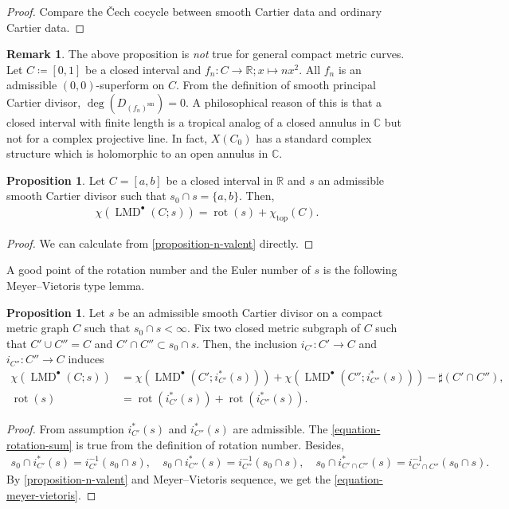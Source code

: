 \documentclass[a4paper,dvipdfmx,reqno,12pt]{amsart}
\theoremstyle{definition}
\newtheorem{proposition}[theorem]{Proposition}
\newtheorem{remark}[theorem]{Remark}
\newcommand{\deq}{\coloneqq}
\newcommand{\opn}[1]{\operatorname{#1}}
\numberwithin{equation}{section}
\begin{document}
\begin{proof}
Compare the \v{C}ech cocycle between smooth Cartier data and ordinary Cartier data.
\end{proof}

\begin{remark}
\label{remark-rotation-closed-interval} 
The above proposition 
is \emph{not} true for general compact metric curves.
Let $C\deq [0,1]$ be a closed interval
and $f_n\colon C\to \mathbb{R};x \mapsto nx^{2}$.
All $f_n$ is an admissible $(0,0)$-superform on $C$.
From the definition of smooth principal Cartier divisor,
$\opn{deg}(D_{(f_n)^{\mathrm{sm}}})=0$. 
A philosophical reason of this is that
a closed interval with finite length is a tropical
analog of a closed annulus in $\mathbb{C}$ but not for
a complex projective line. In fact, $X(C_0)$ 
has a standard complex structure which is holomorphic to
an open annulus in $\mathbb{C}$.
\end{remark}

\begin{proposition}
\label{proposition-simple-interval-rr}
Let $C=[a,b]$ be a closed interval in $\mathbb{R}$
and $s$ an admissible smooth Cartier divisor 
such that $s_0\cap s=\{a,b\}$. Then,
\begin{align}
\chi(\opn{LMD}^{\bullet}(C;s))=\opn{rot}(s)+
\chi_{\opn{top}}(C).
\end{align}
\end{proposition}
\begin{proof}
We can calculate from 
\cref{proposition-n-valent} directly.
\end{proof}

A good point of the rotation number and the 
Euler number of $s$ is the 
following Meyer--Vietoris type lemma.

\begin{proposition}
\label{proposition-gluing-formula}
Let $s$ be an admissible smooth Cartier divisor on a
compact metric graph $C$ such that $s_0\cap s<\infty$.
Fix two closed metric subgraph of $C$ such that
$C' \cup C''=C$ and $C'\cap C''\subset s_0 \cap s$.
Then, 
the inclusion $i_{C'}\colon C'\to C$ 
and $i_{C''}\colon C''\to C$ induces
\begin{align}
\label{equation-meyer-vietoris}
\chi(\opn{LMD}^{\bullet}(C;s))
&=\chi(\opn{LMD}^{\bullet}(C';i_{C'}^{*}(s)))
+\chi(\opn{LMD}^{\bullet}(C'';i_{C''}^{*}(s)))
-\sharp(C'\cap C''), \\
\label{equation-rotation-sum}
\opn{rot}(s)&=\opn{rot}(i_{C'}^{*}(s))
+\opn{rot}(i_{C''}^{*}(s)).
\end{align}
\end{proposition}
\begin{proof}
From assumption $i^{*}_{C'}(s)$ and 
$i^{*}_{C''}(s)$ are admissible.
The \cref{equation-rotation-sum} is true from
the definition of rotation number. 
 Besides,
\begin{align}
s_0\cap i^{*}_{C'}(s)=i^{-1}_{C'}(s_0\cap s), \quad 
s_0\cap i^{*}_{C''}(s)=i^{-1}_{C''}(s_0\cap s), \quad
s_0\cap i^{*}_{C'\cap C''}(s)=
i^{-1}_{C'\cap C''}(s_0\cap s).
\end{align}
By \cref{proposition-n-valent} 
and Meyer--Vietoris sequence, we get 
the \cref{equation-meyer-vietoris}.
\end{proof}
\end{document}
